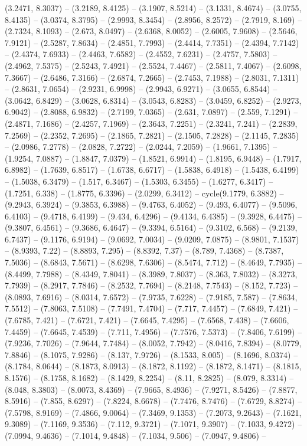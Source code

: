 (3.2471, 8.3037) -- (3.2189, 8.4125) -- (3.1907, 8.5214) -- (3.1331, 8.4674) -- (3.0755, 8.4135) -- (3.0374, 8.3795) -- (2.9993, 8.3454) -- (2.8956, 8.2572) -- (2.7919, 8.169) -- (2.7324, 8.1093) -- (2.673, 8.0497) -- (2.6368, 8.0052) -- (2.6005, 7.9608) -- (2.5646, 7.9121) -- (2.5287, 7.8634) -- (2.4851, 7.7993) -- (2.4414, 7.7351) -- (2.4394, 7.7142) -- (2.4374, 7.6933) -- (2.4463, 7.6582) -- (2.4552, 7.6231) -- (2.4757, 7.5803) -- (2.4962, 7.5375) -- (2.5243, 7.4921) -- (2.5524, 7.4467) -- (2.5811, 7.4067) -- (2.6098, 7.3667) -- (2.6486, 7.3166) -- (2.6874, 7.2665) -- (2.7453, 7.1988) -- (2.8031, 7.1311) -- (2.8631, 7.0654) -- (2.9231, 6.9998) -- (2.9943, 6.9271) -- (3.0655, 6.8544) -- (3.0642, 6.8429) -- (3.0628, 6.8314) -- (3.0543, 6.8283) -- (3.0459, 6.8252) -- (2.9273, 6.9042) -- (2.8088, 6.9832) -- (2.7199, 7.0365) -- (2.631, 7.0897) -- (2.559, 7.1291) -- (2.4871, 7.1686) -- (2.4257, 7.1969) -- (2.3643, 7.2251) -- (2.3241, 7.241) -- (2.2839, 7.2569) -- (2.2352, 7.2695) -- (2.1865, 7.2821) -- (2.1505, 7.2828) -- (2.1145, 7.2835) -- (2.0986, 7.2778) -- (2.0828, 7.2722) -- (2.0244, 7.2059) -- (1.9661, 7.1395) -- (1.9254, 7.0887) -- (1.8847, 7.0379) -- (1.8521, 6.9914) -- (1.8195, 6.9448) -- (1.7917, 6.8982) -- (1.7639, 6.8517) -- (1.6738, 6.6717) -- (1.5838, 6.4918) -- (1.5438, 6.4199) -- (1.5038, 6.3479) -- (1.517, 6.3467) -- (1.5303, 6.3455) -- (1.6277, 6.3417) -- (1.7251, 6.338) -- (1.8775, 6.3396) -- (2.0299, 6.3412) -- cycle(9.1779, 6.3882) -- (9.2943, 6.3924) -- (9.3853, 6.3988) -- (9.4763, 6.4052) -- (9.493, 6.4077) -- (9.5096, 6.4103) -- (9.4718, 6.4199) -- (9.434, 6.4296) -- (9.4134, 6.4385) -- (9.3928, 6.4475) -- (9.3807, 6.4561) -- (9.3686, 6.4647) -- (9.3394, 6.5164) -- (9.3102, 6.568) -- (9.2139, 6.7437) -- (9.1176, 6.9194) -- (9.0692, 7.0034) -- (9.0209, 7.0875) -- (8.9801, 7.1537) -- (8.9393, 7.22) -- (8.8893, 7.295) -- (8.8392, 7.37) -- (8.789, 7.4368) -- (8.7387, 7.5036) -- (8.6843, 7.5671) -- (8.6298, 7.6306) -- (8.5474, 7.712) -- (8.4649, 7.7935) -- (8.4499, 7.7988) -- (8.4349, 7.8041) -- (8.3989, 7.8037) -- (8.363, 7.8032) -- (8.3273, 7.7939) -- (8.2917, 7.7846) -- (8.2532, 7.7694) -- (8.2148, 7.7543) -- (8.152, 7.723) -- (8.0893, 7.6916) -- (8.0314, 7.6572) -- (7.9735, 7.6228) -- (7.9185, 7.587) -- (7.8634, 7.5512) -- (7.8063, 7.5108) -- (7.7491, 7.4704) -- (7.717, 7.4457) -- (7.6849, 7.421) -- (7.6785, 7.421) -- (7.6721, 7.421) -- (7.6645, 7.4295) -- (7.6568, 7.438) -- (7.6606, 7.4459) -- (7.6645, 7.4539) -- (7.711, 7.4956) -- (7.7576, 7.5373) -- (7.8406, 7.6199) -- (7.9236, 7.7026) -- (7.9644, 7.7484) -- (8.0052, 7.7942) -- (8.0416, 7.8394) -- (8.0779, 7.8846) -- (8.1075, 7.9286) -- (8.137, 7.9726) -- (8.1533, 8.005) -- (8.1696, 8.0374) -- (8.1784, 8.0644) -- (8.1873, 8.0913) -- (8.1872, 8.1192) -- (8.1872, 8.1471) -- (8.1815, 8.1576) -- (8.1758, 8.1682) -- (8.1429, 8.2254) -- (8.11, 8.2825) -- (8.079, 8.3314) -- (8.048, 8.3803) -- (8.0073, 8.4369) -- (7.9665, 8.4936) -- (7.9271, 8.5426) -- (7.8877, 8.5916) -- (7.855, 8.6297) -- (7.8224, 8.6678) -- (7.7476, 8.7476) -- (7.6729, 8.8274) -- (7.5798, 8.9169) -- (7.4866, 9.0064) -- (7.3469, 9.1353) -- (7.2073, 9.2643) -- (7.1621, 9.3089) -- (7.1169, 9.3536) -- (7.112, 9.3721) -- (7.1071, 9.3907) -- (7.1033, 9.4272) -- (7.0994, 9.4636) -- (7.1014, 9.4848) -- (7.1034, 9.506) -- (7.0947, 9.4806) -- 